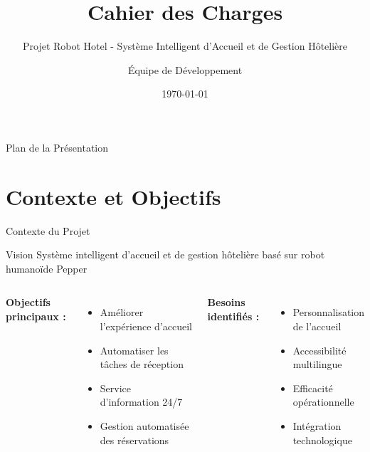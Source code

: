 \documentclass[aspectratio=169,11pt]{beamer}
\title[Robot Hotel]{Cahier des Charges}
\subtitle{Projet Robot Hotel - Système Intelligent d'Accueil et de Gestion Hôtelière}
\author{Équipe de Développement}
\institute{Université d'Avignon}
\date{\today}
\begin{document}
\frame{\titlepage}

\begin{frame}{Plan de la Présentation}
\tableofcontents
\end{frame}


\section{Contexte et Objectifs}

\begin{frame}{Contexte du Projet}
\begin{block}{Vision}
Système intelligent d'accueil et de gestion hôtelière basé sur robot humanoïde Pepper
\end{block}

\begin{columns}
\textbf{Objectifs principaux :}
\begin{itemize}
    \item Améliorer l'expérience d'accueil
    \item Automatiser les tâches de réception
    \item Service d'information 24/7
    \item Gestion automatisée des réservations
\end{itemize}

\textbf{Besoins identifiés :}
\begin{itemize}
    \item Personnalisation de l'accueil
    \item Accessibilité multilingue
    \item Efficacité opérationnelle
    \item Intégration technologique
\end{itemize}
\end{columns}
\end{frame}
\end{document}
